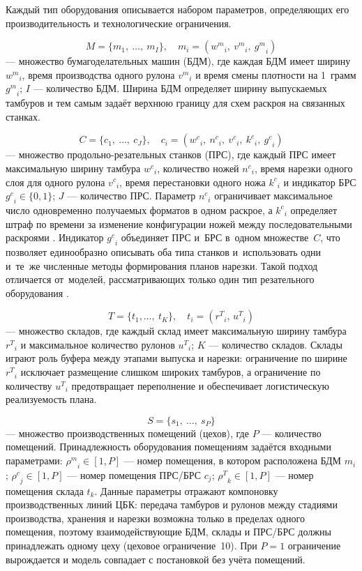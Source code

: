 Каждый тип оборудования описывается набором параметров, определяющих его производительность и технологические ограничения.

\[
M = \{ m_{1},\ \ldots,\ m_{I}\},\quad m_{i} = ({w^m}_{i},\ {v^m}_{i},\ {g^m}_{i})
\]
--- множество бумагоделательных машин (БДМ), где каждая БДМ имеет ширину ${w^m}_{i}$, время производства одного рулона ${v^m}_{i}$ и время смены плотности на 1~грамм ${g^m}_{i}$; $I$ --- количество БДМ.
Ширина БДМ определяет ширину выпускаемых тамбуров и тем самым задаёт верхнюю границу для схем раскроя на связанных станках.

\[
C = \{ c_{1},\ \ldots,\ c_{J}\},\quad c_{i} = ({w^c}_{i},\ {n^c}_{i},\ {v^c}_{i},\ {k^c}_{i},\ {g^c}_{i})
\]
--- множество продольно-резательных станков (ПРС), где каждый ПРС имеет максимальную ширину тамбура ${w^c}_{i}$, количество ножей ${n^c}_{i}$, время нарезки одного слоя для одного рулона ${v^c}_{i}$, время перестановки одного ножа ${k^c}_{i}$ и индикатор БРС ${g^c}_{i} \in \{ 0,1\}$; $J$ --- количество ПРС.
Параметр ${n^c}_{i}$ ограничивает максимальное число одновременно получаемых форматов в одном раскрое, а ${k^c}_{i}$ определяет штраф по времени за изменение конфигурации ножей между последовательными раскроями \cite{mobasher2013,martina2022, brucker2007_scheduling_algorithms}.
Индикатор ${g^c}_i$ объединяет ПРС и~БРС в~одном множестве~$C$, что позволяет единообразно описывать оба типа станков и~использовать одни и~те~же численные методы формирования планов нарезки.
Такой подход отличается от~моделей, рассматривающих только один тип резательного оборудования \cite{gilmore1961linear,haessler1991}.

\[
T = \{ t_{1},\ldots,\ t_{K}\},\quad t_{i} = ({r^T}_{i},\,{u^T}_{i})
\]
--- множество складов, где каждый склад имеет максимальную ширину тамбура ${r^T}_{i}$ и максимальное количество рулонов ${u^T}_{i}$; $K$ --- количество складов.
Склады играют роль буфера между этапами выпуска и нарезки: ограничение по ширине ${r^T}_{i}$ исключает размещение слишком широких тамбуров, а ограничение по количеству ${u^T}_{i}$ предотвращает переполнение и обеспечивает логистическую реализуемость плана.


\[
S = \{ s_{1},\ \ldots,\ s_{P}\}
\]
--- множество производственных помещений (цехов), где $P$ --- количество помещений.
Принадлежность оборудования помещениям задаётся входными параметрами:
${\rho^m}_{i} \in [1,P]$ --- номер помещения, в котором расположена БДМ $m_i$;
${\rho^c}_{j} \in [1,P]$ --- номер помещения ПРС/БРС $c_j$;
${\rho^T}_{k} \in [1,P]$ --- номер помещения склада $t_k$.
Данные параметры отражают компоновку производственных линий ЦБК: передача тамбуров и рулонов между стадиями производства, хранения и нарезки возможна только в пределах одного помещения, поэтому взаимодействующие БДМ, склады и ПРС/БРС должны принадлежать одному цеху (цеховое ограничение~10).
При $P=1$ ограничение вырождается и модель совпадает с постановкой без учёта помещений.

